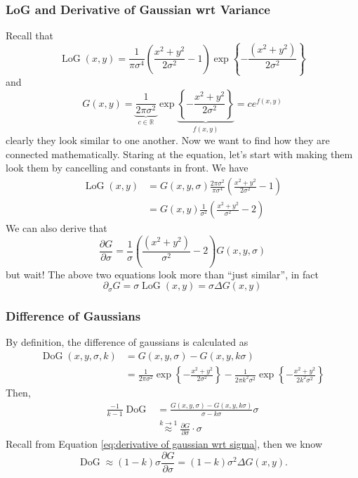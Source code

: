 \documentclass[11pt]{article}
\begin{document}
\subsubsection{LoG and Derivative of Gaussian wrt Variance} Recall that 
\begin{equation}
	\operatorname{LoG} (x, y)  = \frac{1}{\pi \sigma^4} \left( \frac{x^2 + y^2}{2\sigma^2} - 1\right) \exp\left\{ - \frac{(x^2 + y^2)}{2\sigma^2} \right\}
\end{equation}
and 
\begin{equation}
	G(x, y)=\underbrace{\frac{1}{2 \pi \sigma^{2}}}_{c \in \mathbb{R}} \exp \underbrace{\left\{-\frac{x^{2}+y^{2}}{2 \sigma^{2}}\right\}}_{f(x, y)}=c e^{f(x, y)}
\end{equation}
clearly they look similar to one another. Now we want to find how they are connected mathematically. Staring at the equation, let's start with making them look them by cancelling and constants in front. We have
\begin{align}
	\operatorname{LoG}(x,y) 
	&= G(x,y,\sigma) \frac{2\pi\sigma^2}{\pi\sigma^4} \left( \frac{x^2 + y^2}{2\sigma^2} - 1\right) \\
	&= G(x, y) \frac{1}{\sigma^{2}}\left(\frac{x^{2}+y^{2}}{\sigma^{2}}-2\right)
\end{align}
We can also derive that 
\begin{equation}
	\frac{\partial G}{\partial \sigma}=\frac{1}{\sigma}\left(\frac{\left(x^{2}+y^{2}\right)}{\sigma^{2}}-2\right) G(x, y, \sigma)
\end{equation}
but wait! The above two equations look more than ``just similar'', in fact
\begin{equation}
	\partial_\sigma G = \sigma\operatorname{LoG}(x, y) = \sigma \Delta G(x, y) \label{eq:derivative of gaussian wrt sigma}
\end{equation}

\subsubsection{Difference of Gaussians\label{sec:difference of gaussians}}
By definition, the difference of gaussians is calculated as
\begin{align}
	\operatorname{DoG} (x, y, \sigma, k) 
	&= G(x, y, \sigma) - G (x, y, k\sigma) \\
	&= \frac{1}{2\pi\sigma^2}\exp\left\{ - \frac{x^2 + y^2}{2\sigma^2} \right\} - \frac{1}{2\pi k^2\sigma^2}\exp\left\{ - \frac{x^2 + y^2}{2k^2\sigma^2} \right\}
\end{align}
Then, 
\begin{align}
	\frac{-1}{k - 1} \operatorname{DoG} 
	&= \frac{G(x, y, \sigma) - G(x, y, k\sigma)}{\sigma - k \sigma} \sigma \\
	&\overset{k \rightarrow 1}{\approx} \frac{\partial G}{\partial \sigma}\cdot \sigma
\end{align} 
Recall from Equation \ref{eq:derivative of gaussian wrt sigma}, then we know
\begin{equation}
	\operatorname{DoG} \approx (1 - k) \sigma \frac{\partial G}{\partial \sigma} = (1 - k) \sigma^2 \Delta G(x, y). 
\end{equation}
\end{document}

